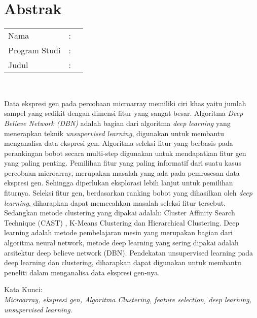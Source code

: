 %
%
%

\chapter*{Abstrak}

\vspace*{0.2cm}

\noindent \begin{tabular}{l l p{10cm}}
	Nama&: & \penulis \\
	Program Studi&: & \program \\
	Judul&: & \judul \\
\end{tabular} \\ 

\vspace*{0.5cm}

\noindent 
Data ekspresi gen pada percobaan microarray memiliki ciri khas yaitu jumlah sampel yang sedikit dengan dimensi fitur yang sangat besar. Algoritma \textit{Deep Believe Network (DBN)}  adalah bagian dari algoritma \textit{deep learning} yang menerapkan teknik \textit{unsupervised learning}, digunakan untuk membantu menganalisa data ekspresi gen. Algoritma seleksi fitur yang berbasis pada perankingan bobot secara multi-step digunakan untuk mendapatkan fitur gen yang paling penting. Pemilihan fitur yang paling informatif dari suatu kasus percobaan microarray, merupakan  masalah yang ada pada pemrosesan data ekspresi gen. Sehingga diperlukan eksplorasi lebih lanjut untuk pemilihan fiturnya. Seleksi fitur gen, berdasarkan ranking bobot yang dihasilkan oleh \textit{deep learning}, diharapkan dapat memecahkan masalah seleksi fitur tersebut. Sedangkan metode clustering yang dipakai adalah: Cluster Affinity Search Technique (CAST) , K-Means Clustering dan Hierarchical Clustering. Deep learning adalah metode pembelajaran mesin yang merupakan bagian dari algoritma neural network, metode deep learning yang sering dipakai adalah arsitektur deep believe network (DBN). Pendekatan unsupervised learning pada deep learning dan clustering, diharapkan dapat digunakan untuk membantu peneliti dalam menganalisa data ekspresi gen-nya.

\vspace*{0.2cm}

\noindent Kata Kunci: \\ 
\noindent 
\textit{Microarray, ekspresi gen, Algoritma Clustering, feature selection, deep learning, unsupervised learning.}

\newpage